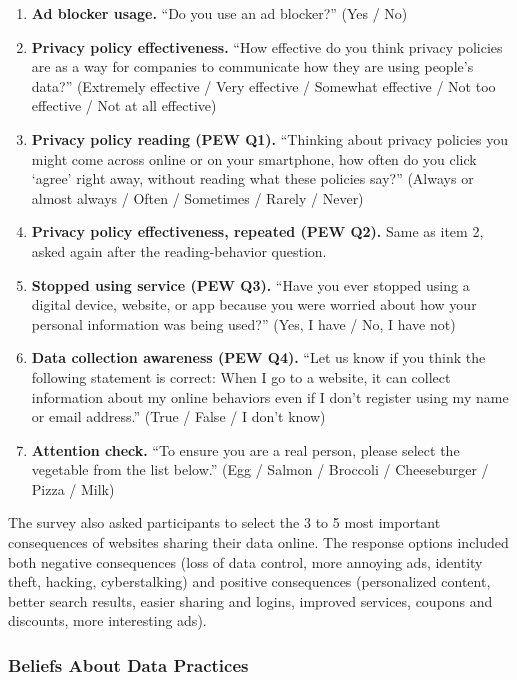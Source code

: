 \documentclass[12pt]{article}
\theoremstyle{definition}
\theoremstyle{remark}
\begin{document}
\begin{appendix}
\begin{enumerate}[leftmargin=*,itemsep=2pt]
    \item \textbf{Ad blocker usage.} ``Do you use an ad blocker?'' (Yes / No)
    \item \textbf{Privacy policy effectiveness.} ``How effective do you think privacy policies are as a way for companies to communicate how they are using people's data?'' (Extremely effective / Very effective / Somewhat effective / Not too effective / Not at all effective)
    \item \textbf{Privacy policy reading (PEW Q1).} ``Thinking about privacy policies you might come across online or on your smartphone, how often do you click `agree' right away, without reading what these policies say?'' (Always or almost always / Often / Sometimes / Rarely / Never)
    \item \textbf{Privacy policy effectiveness, repeated (PEW Q2).} Same as item 2, asked again after the reading-behavior question.
    \item \textbf{Stopped using service (PEW Q3).} ``Have you ever stopped using a digital device, website, or app because you were worried about how your personal information was being used?'' (Yes, I have / No, I have not)
    \item \textbf{Data collection awareness (PEW Q4).} ``Let us know if you think the following statement is correct: When I go to a website, it can collect information about my online behaviors even if I don't register using my name or email address.'' (True / False / I don't know)
    \item \textbf{Attention check.} ``To ensure you are a real person, please select the vegetable from the list below.'' (Egg / Salmon / Broccoli / Cheeseburger / Pizza / Milk)
\end{enumerate}

The survey also asked participants to select the 3 to 5 most important consequences of websites sharing their data online. The response options included both negative consequences (loss of data control, more annoying ads, identity theft, hacking, cyberstalking) and positive consequences (personalized content, better search results, easier sharing and logins, improved services, coupons and discounts, more interesting ads).

\subsubsection{Beliefs About Data Practices}\label{sec:survey_beliefs}


\end{appendix}
\end{document}
